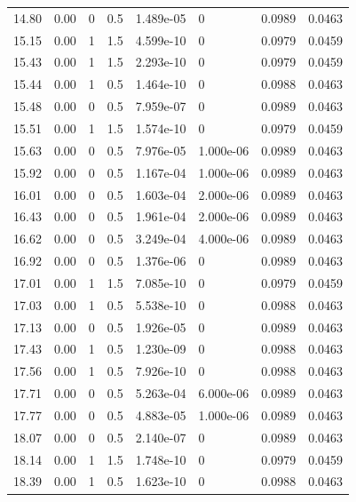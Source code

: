 \documentclass[preview]{standalone}
\begin{document}
{{{\begin{tabular}{L{1.2cm}C{1.2cm} C{0.3cm}C{0.5cm} C{1.4cm}C{1.4cm} C{1.4cm}C{1.4cm}}
  14.80  &  0.00  & 0     & 0.5 &  1.489e-05  & 0  & 0.0989 &  0.0463   \\ 
  15.15  &  0.00  & 1     & 1.5 &  4.599e-10  & 0  & 0.0979 &  0.0459   \\ 
  15.43  &  0.00  & 1     & 1.5 &  2.293e-10  & 0  & 0.0979 &  0.0459   \\ 
  15.44  &  0.00  & 1     & 0.5 &  1.464e-10  & 0  & 0.0988 &  0.0463   \\ 
  15.48  &  0.00  & 0     & 0.5 &  7.959e-07  & 0  & 0.0989 &  0.0463   \\ 
  15.51  &  0.00  & 1     & 1.5 &  1.574e-10  & 0  & 0.0979 &  0.0459   \\ 
  15.63  &  0.00  & 0     & 0.5 &  7.976e-05  & 1.000e-06  & 0.0989 &  0.0463   \\ 
  15.92  &  0.00  & 0     & 0.5 &  1.167e-04  & 1.000e-06  & 0.0989 &  0.0463   \\ 
  16.01  &  0.00  & 0     & 0.5 &  1.603e-04  & 2.000e-06  & 0.0989 &  0.0463   \\ 
  16.43  &  0.00  & 0     & 0.5 &  1.961e-04  & 2.000e-06  & 0.0989 &  0.0463   \\ 
  16.62  &  0.00  & 0     & 0.5 &  3.249e-04  & 4.000e-06  & 0.0989 &  0.0463   \\ 
  16.92  &  0.00  & 0     & 0.5 &  1.376e-06  & 0  & 0.0989 &  0.0463   \\ 
  17.01  &  0.00  & 1     & 1.5 &  7.085e-10  & 0  & 0.0979 &  0.0459   \\ 
  17.03  &  0.00  & 1     & 0.5 &  5.538e-10  & 0  & 0.0988 &  0.0463   \\ 
  17.13  &  0.00  & 0     & 0.5 &  1.926e-05  & 0  & 0.0989 &  0.0463   \\ 
  17.43  &  0.00  & 1     & 0.5 &  1.230e-09  & 0  & 0.0988 &  0.0463   \\ 
  17.56  &  0.00  & 1     & 0.5 &  7.926e-10  & 0  & 0.0988 &  0.0463   \\ 
  17.71  &  0.00  & 0     & 0.5 &  5.263e-04  & 6.000e-06  & 0.0989 &  0.0463   \\ 
  17.77  &  0.00  & 0     & 0.5 &  4.883e-05  & 1.000e-06  & 0.0989 &  0.0463   \\ 
  18.07  &  0.00  & 0     & 0.5 &  2.140e-07  & 0  & 0.0989 &  0.0463   \\ 
  18.14  &  0.00  & 1     & 1.5 &  1.748e-10  & 0  & 0.0979 &  0.0459   \\ 
  18.39  &  0.00  & 1     & 0.5 &  1.623e-10  & 0  & 0.0988 &  0.0463   \\ 

\end{tabular}}}}
\end{document}
